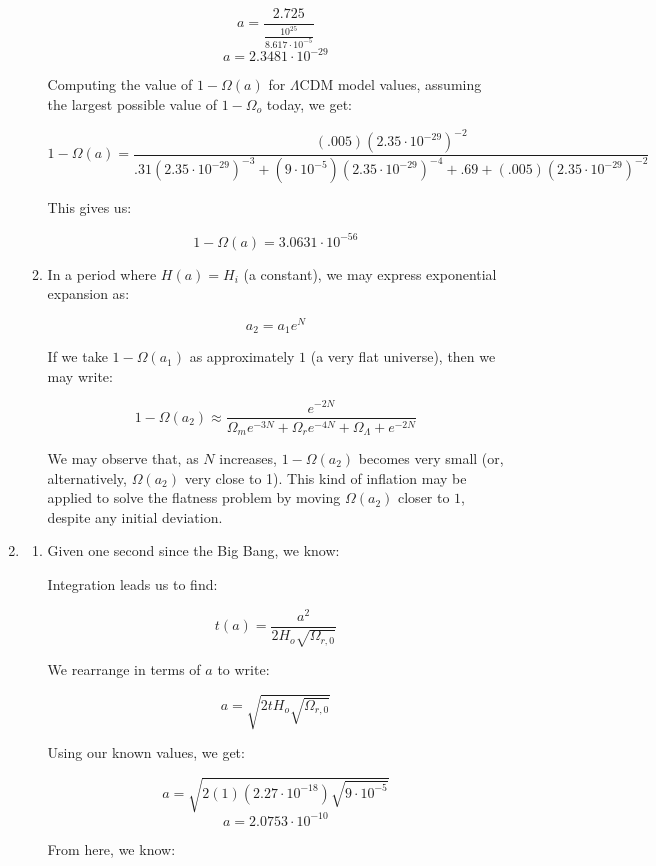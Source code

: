 \begin{enumerate}
\begin{enumerate}
        $$a=\frac{2.725}{\frac{10^{25}}{8.617\cdot10^{-5}}}$$
        $$a=2.3481\cdot10^{-29}$$

        Computing the value of $1-\Omega(a)$ for $\Lambda$CDM model values, assuming the largest possible value of $1-\Omega_o$ today, we get:

        $$1-\Omega(a)=\frac{(.005)(2.35\cdot10^{-29})^{-2}}{.31(2.35\cdot10^{-29})^{-3}+(9\cdot10^{-5})(2.35\cdot10^{-29})^{-4}+.69+(.005)(2.35\cdot10^{-29})^{-2}}$$

        This gives us:

        $$\boxed{1-\Omega(a)=3.0631\cdot10^{-56}}$$

      \item In a period where $H(a)=H_i$ (a constant), we may express exponential expansion as:

        $$a_2=a_1e^N$$

        If we take $1-\Omega(a_1)$ as approximately $1$ (a very flat universe), then we may write:

        $$\boxed{1-\Omega(a_2)\approx \frac{e^{-2N}}{\Omega_me^{-3N}+\Omega_re^{-4N}+\Omega_{\Lambda}+e^{-2N}}}$$

        We may observe that, as $N$ increases, $1-\Omega(a_2)$ becomes very small (or, alternatively, $\Omega(a_2)$ very close to 1). This kind of inflation may be applied to solve the flatness problem by moving $\Omega(a_2)$ closer to $1$, despite any initial deviation.

    \end{enumerate}

  \item

    \begin{enumerate}

      \item Given one second since the Big Bang, we know:

        Integration leads us to find:

        $$t(a)=\frac{a^2}{2H_o\sqrt{\Omega_{r,0}}}$$

        We rearrange in terms of $a$ to write:

        $$a=\sqrt{2tH_o\sqrt{\Omega_{r,0}}}$$
        
        Using our known values, we get:

        $$a=\sqrt{2(1)\left(2.27\cdot10^{-18}\right)\sqrt{9\cdot10^{-5}}}$$
        $$\boxed{a=2.0753\cdot10^{-10}}$$

        From here, we know:


\end{enumerate}
\end{enumerate}
